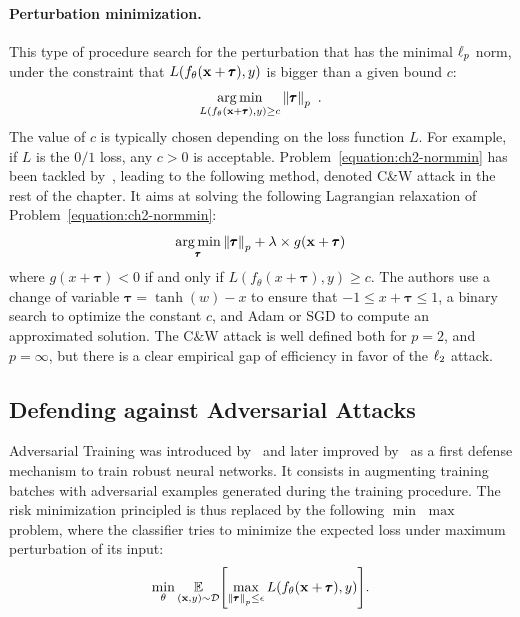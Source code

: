 \paragraph{Perturbation minimization.}
This type of procedure search for the perturbation that has the minimal $\ell_p $ norm, under the constraint that $L(f_\theta(\mathbf{x} + \pmb{\tau}), y)$ is bigger than a given bound $c$:
\begin{equation}
  \operatorname*{arg\,min}_{L(f_\theta(\mathbf{x} + \pmb{\tau}), y) \geq c} \norm{\pmb{\tau}}_p \enspace.
  \label{equation:ch2-normmin}
\end{equation}
The value of $c$ is typically chosen depending on the loss function $L$. For example, if $L$ is the $0/1$ loss, any $c > 0$ is acceptable.
Problem~\ref{equation:ch2-normmin} has been tackled by~\citet{carlini2017towards}, leading to the following method, denoted C\&W attack in the rest of the chapter. It aims at solving the following Lagrangian relaxation of Problem~\ref{equation:ch2-normmin}:
\begin{equation}
  \operatorname*{arg\,min}_{\pmb{\tau}} \norm{\pmb{\tau}}_p+ \lambda \times g(\mathbf{x}+\pmb{\tau})
\end{equation}
where $g(x+\pmb{\tau})<0$ if and only if $L(f_\theta(x+\pmb{\tau}),y) \geq c$. 
The authors use a change of variable $\pmb{\tau}=\tanh(w)-x$ to ensure that $-1 \leq x+\pmb{\tau} \leq 1$, a binary search to optimize the constant $c$, and Adam or SGD to compute an approximated solution.
The C\&W attack is well defined both for $p=2$, and $p=\infty$, but there is a clear empirical gap of efficiency in favor of the $\ell_2 $ attack.


\subsection{Defending against Adversarial Attacks}
\label{subsection:ch2-defending_against_adversarial_attacks}

Adversarial Training was introduced by~\citet{goodfellow2014explaining} and later improved by~\citet{madry2018towards} as a first defense mechanism to train robust neural networks.
It consists in augmenting training batches with adversarial examples generated during the training procedure.
The risk minimization principled is thus replaced by the following $\min$ $\max$ problem, where the classifier tries to minimize the expected loss under maximum perturbation of its input:
\begin{equation}
  \min_{\theta} \Ebb_{(\xvec, y) \sim \mathcal{D}} \left[ \max_{\norm{\pmb{\tau}}_p \leq \epsilon} L \left( f_{\theta}(\xvec + \pmb{\tau}), y \right) \right].
\end{equation}


